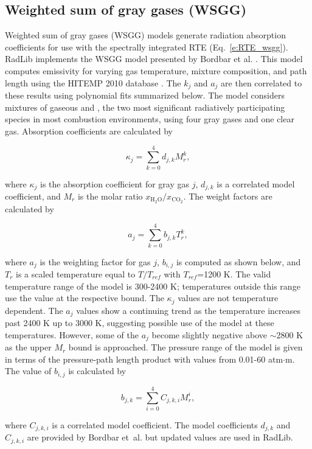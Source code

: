 \documentclass[preprint,12pt]{elsarticle}
\begin{document}

\subsection{Weighted sum of gray gases (WSGG)} \label{s:wsgg}

Weighted sum of gray gases (WSGG) models generate radiation absorption coefficients for use with the spectrally integrated RTE (Eq.~\ref{e:RTE_wsgg}).
RadLib implements the WSGG model presented by Bordbar et al. \citep{Bordbar_2014,Bordbar_2020}. This model computes emissivity for varying gas temperature, mixture composition, and path length using the HITEMP 2010 database \cite{Rothman_2010}. The $k_j$ and $a_j$ are then correlated to these results using polynomial fits summarized below. The model considers mixtures of gaseous  and , the two most significant radiatively participating species in most combustion environments, using four gray gases and one clear gas. Absorption coefficients are calculated by
%
\begin{linenomath}
\begin{equation}
    \kappa_j=\sum_{k=0}^{4}d_{j,k}M_r^k,
\end{equation}
\end{linenomath}
%
where $\kappa_j$ is the absorption coefficient for gray gas $j$, $d_{j,k}$ is a correlated model coefficient, and $M_r$ is the molar ratio $x_{\mathrm{H_2O}}/x_{\mathrm{CO_2}}$. The weight factors are calculated by
%
\begin{linenomath}
\begin{equation}
    a_j=\sum_{k=0}^{4}b_{j,k}T_r^k,
\end{equation}
\end{linenomath}
%
where $a_j$ is the weighting factor for gas $j$, $b_{i,j}$ is computed as shown below,  and $T_r$ is a scaled temperature equal to $T/T_{ref}$ with $T_{ref}$=1200 K. The valid temperature range of the model is 300-2400 K; temperatures outside this range use the value at the respective bound. The $\kappa_j$ values are not temperature dependent. The $a_j$ values show a continuing trend as the temperature increases past 2400 K up to 3000 K, suggesting possible use of the model at these temperatures. However, some of the $a_j$ become slightly negative above $\sim$2800 K as the upper $M_r$ bound is approached. The pressure range of the model is given in terms of the pressure-path length product with values from 0.01-60 atm$\cdot$m. The value of $b_{i,j}$ is calculated by
%
\begin{linenomath}
\begin{equation}
    b_{j,k}=\sum_{i=0}^{4}C_{j,k,i}M_r^i,
\end{equation}
\end{linenomath}
%
where $C_{j,k,i}$ is a correlated model coefficient. The model coefficients $d_{j,k}$ and $C_{j,k,i}$ are provided by Bordbar et~al. \citep{Bordbar_2014,Bordbar_2020} but updated values are used in RadLib.
\end{document}

